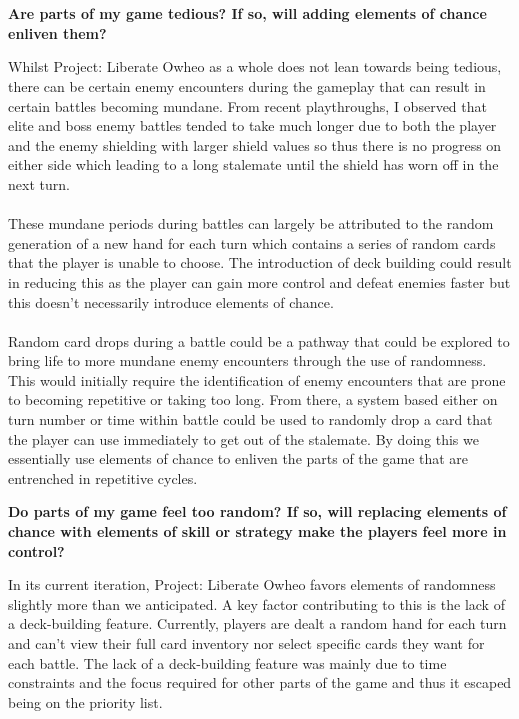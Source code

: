 \documentclass[a4paper]{article}
\begin{document}
\\\\
\begin{center}
\textbf{Are parts of my game tedious? If so, will adding elements of chance enliven them?}
\end{center}
\vspace{1.5em} 
Whilst Project: Liberate Owheo as a whole does not lean towards being tedious, there can be certain enemy encounters during the gameplay that can result in certain battles becoming mundane. From recent playthroughs, I observed that elite and boss enemy battles tended to take much longer due to both the player and the enemy shielding with larger shield values so thus there is no progress on either side which leading to a long stalemate until the shield has worn off in the next turn. 
\\\\
These mundane periods during battles can largely be attributed to the random generation of a new hand for each turn which contains a series of random cards that the player is unable to choose. The introduction of deck building could result in reducing this as the player can gain more control and defeat enemies faster but this doesn’t necessarily introduce elements of chance.
\\\\
Random card drops during a battle could be a pathway that could be explored to bring life to more mundane enemy encounters through the use of randomness. This would initially require the identification of enemy encounters that are prone to becoming repetitive or taking too long. From there, a system based either on turn number or time within battle could be used to randomly drop a card that the player can use immediately to get out of the stalemate. By doing this we essentially use elements of chance to enliven the parts of the game that are entrenched in repetitive cycles.
\newpage
\begin{center}
\textbf{Do parts of my game feel too random? If so, will replacing elements of chance with elements of skill or strategy make the players feel more in control?}
\vspace{1.5em} 
\end{center}
In its current iteration, Project: Liberate Owheo favors elements of randomness slightly more than we anticipated. A key factor contributing to this is the lack of a deck-building feature. Currently, players are dealt a random hand for each turn and can't view their full card inventory nor select specific cards they want for each battle. The lack of a deck-building feature was mainly due to time constraints and the focus required for other parts of the game and thus it escaped being on the priority list.
\end{document}
